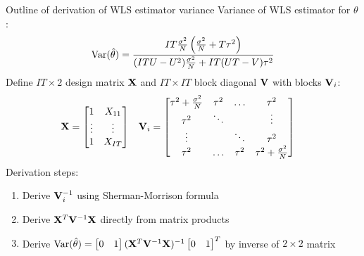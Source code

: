 \documentclass[9pt]{beamer}
\begin{document}
\addtocounter{framenumber}{-1}
\begin{frame}{Outline of derivation of WLS estimator variance}
Variance of WLS estimator for $\theta$:
\[
\mathrm{Var}(\hat{\theta}) = \frac{IT\frac{\sigma^2}{N}\left(\frac{\sigma^2}{N}+T\tau^2\right)}{(ITU-U^2)\frac{\sigma^2}{N}+IT(UT-V)\tau^2}
\]
Define $IT\times2$ design matrix $\mathbf{X}$ and $IT\times IT$ block diagonal $\mathbf{V}$ with blocks $\mathbf{V}_i$:
\begin{align*}
\mathbf{X} &=
\begin{bmatrix}
1 & X_{11} \\
\vdots & \vdots \\
1 & X_{IT}
\end{bmatrix} &
\mathbf{V}_i &=
\begin{bmatrix}
\tau^2 + \frac{\sigma^2}{N} & \tau^2 & \ldots & \tau^2 \\
\tau^2 & \ddots & & \vdots \\
\vdots & & \ddots & \tau^2 \\
\tau^2 & \ldots & \tau^2 & \tau^2 + \frac{\sigma^2}{N}
\end{bmatrix}
\end{align*}
Derivation steps:
\begin{enumerate}
\item
Derive $\mathbf{V}_i^{-1}$ using Sherman-Morrison formula
\item
Derive $\mathbf{X}^T\mathbf{V}^{-1}\mathbf{X}$ directly from matrix products
\item
Derive $\mathrm{Var}(\hat{\theta}) = \begin{bmatrix}0&1\end{bmatrix}(\mathbf{X}^T\mathbf{V}^{-1}\mathbf{X})^{-1}\begin{bmatrix}0&1\end{bmatrix}^T$ by inverse of $2\times2$ matrix
\end{enumerate}
\end{frame}
\end{document}
